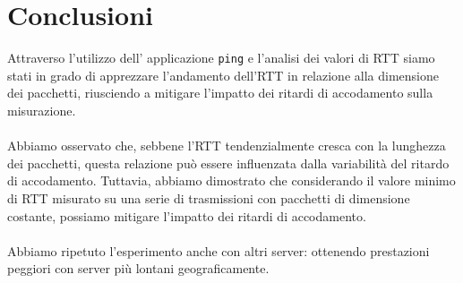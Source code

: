 \section{Conclusioni}
Attraverso l'utilizzo dell' applicazione \texttt{ping} e l'analisi dei valori di RTT siamo stati in grado di apprezzare l'andamento dell'RTT in relazione alla dimensione dei pacchetti, riusciendo a mitigare l'impatto dei ritardi di accodamento sulla misurazione.\\\\
Abbiamo osservato che, sebbene l'RTT tendenzialmente cresca con la lunghezza dei pacchetti, questa relazione può essere influenzata dalla variabilità del ritardo di accodamento. Tuttavia, abbiamo dimostrato che considerando il valore minimo di RTT misurato su una serie di trasmissioni con pacchetti di dimensione costante, possiamo mitigare l'impatto dei ritardi di accodamento.\\\\
Abbiamo ripetuto l'esperimento anche con altri server: ottenendo prestazioni peggiori con server più lontani geograficamente.